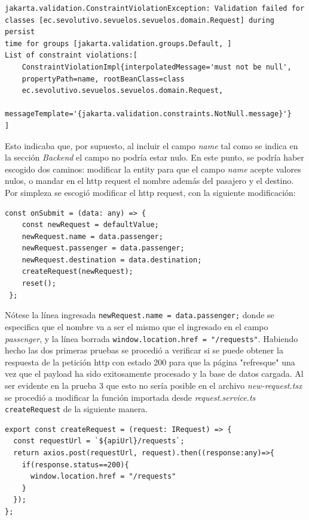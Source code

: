 \documentclass{article}
\begin{document}
\begin{lstlisting}
jakarta.validation.ConstraintViolationException: Validation failed for 
classes [ec.sevolutivo.sevuelos.sevuelos.domain.Request] during persist 
time for groups [jakarta.validation.groups.Default, ]
List of constraint violations:[
	ConstraintViolationImpl{interpolatedMessage='must not be null', 
	propertyPath=name, rootBeanClass=class 
	ec.sevolutivo.sevuelos.sevuelos.domain.Request, 
	messageTemplate='{jakarta.validation.constraints.NotNull.message}'}
]
\end{lstlisting}

	Esto indicaba que, por supuesto, al incluir el campo \emph{name} tal 
	como se indica en la sección \emph{Backend} el campo no podría estar 
	nulo. En este punto, se podría haber escogido dos caminos: modificar la 
	entity para que el campo \emph{name} acepte valores nulos, o mandar en 
	el http request el nombre además del pasajero y el destino. Por 
	simpleza se escogió modificar el http request, con la siguiente 
	modificación:
	
\begin{lstlisting}
const onSubmit = (data: any) => {
    const newRequest = defaultValue;
    newRequest.name = data.passenger;
    newRequest.passenger = data.passenger;
    newRequest.destination = data.destination;
    createRequest(newRequest);
    reset();
 };
\end{lstlisting}
	Nótese la línea ingresada \texttt{newRequest.name = data.passenger;} 
	donde se especifica que el nombre va a ser el mismo que el ingresado en 
	el campo \emph{passenger}, y la línea borrada 
	\texttt{window.location.href = "/requests"}. Habiendo hecho las dos 
	primeras pruebas se procedió a verificar si se puede obtener la 
	respuesta de la petición http con estado 200 para que la página 
	"refresque" una vez que el payload ha sido exitosamente procesado y la 
	base de datos cargada. Al ser evidente en la prueba 3 que esto no sería 
	posible en el archivo \emph{new-request.tsx} se procedió a modificar la 
	función importada desde \emph{request.service.ts} 
	\texttt{createRequest} de la siguiente manera.
	
	\begin{lstlisting}
export const createRequest = (request: IRequest) => {
  const requestUrl = `${apiUrl}/requests`;
  return axios.post(requestUrl, request).then((response:any)=>{
    if(response.status==200){
      window.location.href = "/requests"
    }
  });
};
	\end{lstlisting}
	
\end{document}
